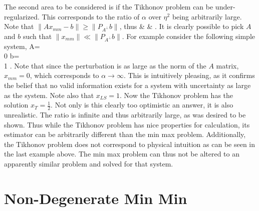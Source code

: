 The second area to be considered is if the Tikhonov problem can be under-regularized.  This corresponds to the ratio of $\alpha$ over $\eta^{2}$ being arbitrarily large.  Note that $\| Ax_{mm}-b\|\geq\| P_{A^{\perp}}b\|$, thus
\beq
{} & \geq &
   .
\eeq
It is clearly possible to pick $A$ and $b$ such that $\| x_{mm}\| \ll \| P_{A^{\perp}}b\|$.  For example consider the following simple system,
\beq
A= \\
                0 \emat \qquad
b= \\
                1  \emat \qquad
{}.
\eeq
Note that since the perturbation is as large as the norm of the $A$ matrix, $x_{mm}=0$, which corresponds to $\alpha \rightarrow \infty$.  This is intuitively pleasing, as it confirms the belief that no valid information exists for a system with uncertainty as large as the system.  Note also that $x_{LS}=1$.  Now the Tikhonov problem has the solution $x_{T}=\frac{1}{ 2}$.  Not only is this clearly too optimistic an answer, it is also unrealistic.  The ratio is infinite and thus arbitrarily large, as was desired to be shown.  Thus while the Tikhonov problem has nice properties for calculation, its estimator can be arbitrarily different than the min max problem.  Additionally, the Tikhonov problem does not correspond to physical intuition as can be seen in the last example above.  The min max problem can thus not be altered to an apparently similar problem and solved for that system.

\section{Non-Degenerate Min Min}\label{s-ndmm}

